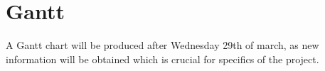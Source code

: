 \documentclass{report}
\begin{document}
\chapter{Gantt}
A Gantt chart will be produced after Wednesday 29th of march, as new information will be obtained which is crucial for specifics of the project.
\printbibliography[heading=bibintoc]

\clearpage
{}
\setcounter{page}{\value{roman}}
\pagestyle{empty}
\appendix
\end{document}
